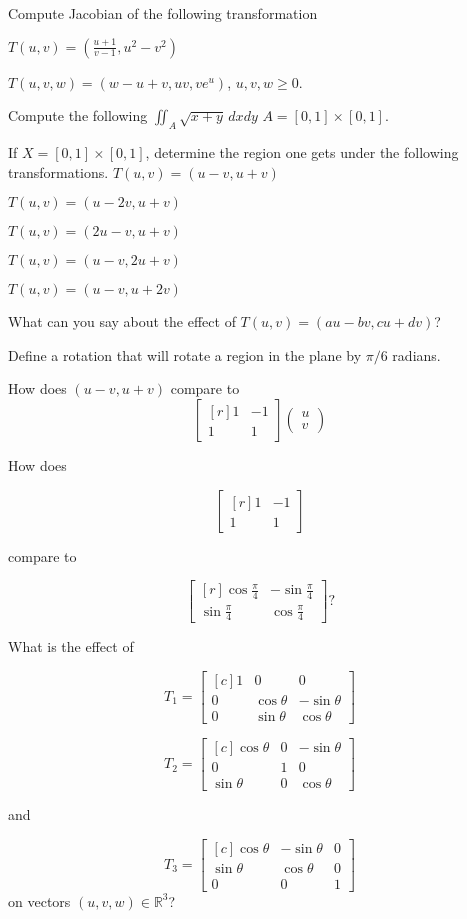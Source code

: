 \documentclass{amsart}
\begin{document}
Compute Jacobian of the following transformation

{
$T(u,v) = \left(\frac{u+1}{v-1}, u^2-v^2\right)$
}
{
}

{
$T(u,v,w) = \left (w-u + v, uv, ve^u\right)$, $u,v,w\geq 0$.
}
{
}

Compute the following 
{
$\iint_A \sqrt{x+y} \, dxdy$ $A=[0,1]\times [0,1]$.
}
{
}

If $X= [0,1]\times [0,1]$, determine the region one gets under the following transformations.
{
$T(u,v) = (u-v,u+v)$
}
{
}

{
$T(u,v) = (u-2v,u+v)$
}
{
}

{
$T(u,v) = (2u-v,u+v)$
}
{
}

{
$T(u,v) = (u-v,2u+v)$
}
{
}

{
$T(u,v) = (u-v,u+2v)$
}
{
}

{
What can you say about the effect of $T(u,v) = (au-bv,cu+dv)$?
}
{
}

{
Define a rotation that will rotate a region in the plane by $\pi/6$ radians.
}
{
}

{
How does $(u-v,u+v)$ compare to 
\[
\begin{bmatrix*}[r]
	1 & -1\\
	1 & 1
\end{bmatrix*}
\begin{pmatrix}
	u \\ 
	v
\end{pmatrix}
\]
}
{
}


{
How does 

\[
\begin{bmatrix*}[r]
	1 & -1\\
	1 & 1
\end{bmatrix*}
\]

compare to 


\[
\begin{bmatrix*}[r]
	\cos \frac{\pi}{4}  & -\sin\frac{\pi}{4}\\
	\sin \frac{\pi}{4} & \cos \frac{\pi}{4}
\end{bmatrix*}?
\]
}
{
}

{
What is the effect of 

\[
T_1 =
\begin{bmatrix*}[c]
1 & 0 &0 \\
0 & \cos \theta & -\sin \theta \\ 
0 & \sin \theta & \cos \theta 
\end{bmatrix*}
\]

\[
T_2 =
\begin{bmatrix*}[c]
\cos \theta & 0 & -\sin \theta \\ 
0 & 1 & 0 \\ 
\sin \theta &0  & \cos \theta 
\end{bmatrix*}
\]

and

\[
T_3 =
\begin{bmatrix*}[c]
 \cos \theta & -\sin \theta & 0 \\ 
\sin \theta & \cos \theta & 0 \\
0 & 0 & 1
\end{bmatrix*}
\]
on vectors $(u,v,w)\in\mathbb{R}^3$?

}
{
}
\end{document}
